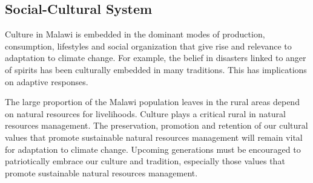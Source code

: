 \documentclass[
]{book}
\begin{document}
\hypertarget{social-cultural-system}{%
\subsection{Social-Cultural System}\label{social-cultural-system}}

Culture in Malawi is embedded in the dominant modes of production, consumption, lifestyles and social organization that give rise and relevance to adaptation to climate change. For example, the belief in disasters linked to anger of spirits has been culturally embedded in many traditions. This has implications on adaptive responses.

The large proportion of the Malawi population leaves in the rural areas depend on natural resources for livelihoods. Culture plays a critical rural in natural resources management. The preservation, promotion and retention of our cultural values that promote sustainable natural resources management will remain vital for adaptation to climate change. Upcoming generations must be encouraged to patriotically embrace our culture and tradition, especially those values that promote sustainable natural resources management.
\end{document}
